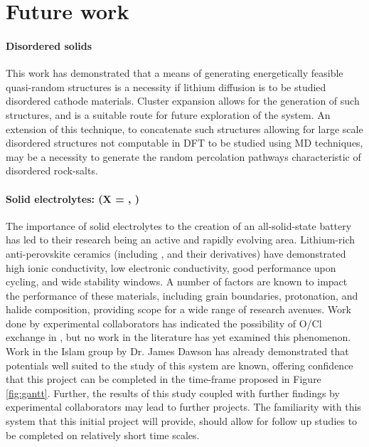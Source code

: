 \section{Future work}
\paragraph{Disordered solids}
This work has demonstrated that a means of generating energetically feasible quasi-random structures is a necessity if lithium diffusion is to be studied disordered cathode materials.
Cluster expansion\cite{Chang2019} allows for the generation of such structures, and is a suitable route for future exploration of the system.
An extension of this technique, to concatenate such structures allowing for large scale disordered structures not computable in DFT to be studied using MD techniques, may be a necessity to generate the random percolation pathways characteristic of disordered rock-salts.

\paragraph{Solid electrolytes:  (X = , )}
The importance of solid electrolytes to the creation of an all-solid-state battery has led to their research being an active and rapidly evolving area.
Lithium-rich anti-perovskite ceramics (including ,  and their derivatives)\cite{Zhao2012} have demonstrated high ionic conductivity, low electronic conductivity, good performance upon cycling, and wide stability windows.
A number of factors are known to impact the performance of these materials, including grain boundaries,\cite{Dawson2018} protonation,\cite{Dawson2018a} and halide composition,\cite{Dawson2018b} providing scope for a wide range of research avenues.
Work done by experimental collaborators has indicated the possibility of O/Cl exchange in , but no work in the literature has yet examined this phenomenon.
Work in the Islam group by Dr. James Dawson has already demonstrated that potentials well suited to the study of this system are known, offering confidence that this project can be completed in the time-frame proposed in Figure \ref{fig:gantt}.
Further, the results of this study coupled with further findings by experimental collaborators may lead to further projects.
The familiarity with this system that this initial project will provide, should allow for follow up studies to be completed on relatively short time scales.



